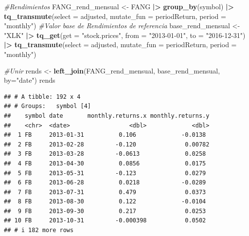 \documentclass[
]{book}
\newenvironment{Shaded}{\begin{snugshade}}{\end{snugshade}}
\newcommand{\AttributeTok}[1]{\textcolor[rgb]{0.13,0.29,0.53}{#1}}
\newcommand{\CommentTok}[1]{\textcolor[rgb]{0.56,0.35,0.01}{\textit{#1}}}
\newcommand{\FunctionTok}[1]{\textcolor[rgb]{0.13,0.29,0.53}{\textbf{#1}}}
\newcommand{\NormalTok}[1]{#1}
\newcommand{\OtherTok}[1]{\textcolor[rgb]{0.56,0.35,0.01}{#1}}
\newcommand{\SpecialCharTok}[1]{\textcolor[rgb]{0.81,0.36,0.00}{\textbf{#1}}}
\newcommand{\StringTok}[1]{\textcolor[rgb]{0.31,0.60,0.02}{#1}}
\begin{document}
\begin{Shaded}
\begin{Highlighting}[]
\CommentTok{\#Rendimientos}
\NormalTok{FANG\_rend\_mensual }\OtherTok{\textless{}{-}}\NormalTok{ FANG }\SpecialCharTok{|\textgreater{}} \FunctionTok{group\_by}\NormalTok{(symbol) }\SpecialCharTok{|\textgreater{}} 
                     \FunctionTok{tq\_transmute}\NormalTok{(}\AttributeTok{select =}\NormalTok{ adjusted,}
                                  \AttributeTok{mutate\_fun =}\NormalTok{ periodReturn,}
                                  \AttributeTok{period =} \StringTok{"monthly"}\NormalTok{)}
\CommentTok{\#Valor base de Rendimientos de referencia}
\NormalTok{base\_rend\_mensual }\OtherTok{\textless{}{-}} \StringTok{"XLK"} \SpecialCharTok{|\textgreater{}} \FunctionTok{tq\_get}\NormalTok{(}\AttributeTok{get =} \StringTok{"stock.prices"}\NormalTok{,}
                                            \AttributeTok{from =} \StringTok{"2013{-}01{-}01"}\NormalTok{,}
                                            \AttributeTok{to =} \StringTok{"2016{-}12{-}31"}\NormalTok{) }\SpecialCharTok{|\textgreater{}} 
                              \FunctionTok{tq\_transmute}\NormalTok{(}\AttributeTok{select =}\NormalTok{ adjusted,}
                                           \AttributeTok{mutate\_fun =}\NormalTok{ periodReturn,}
                                           \AttributeTok{period =} \StringTok{"monthly"}\NormalTok{)}

\CommentTok{\#Unir }
\NormalTok{rends }\OtherTok{\textless{}{-}} \FunctionTok{left\_join}\NormalTok{(FANG\_rend\_mensual, base\_rend\_mensual, }\AttributeTok{by=}\StringTok{"date"}\NormalTok{)}
\NormalTok{rends}
\end{Highlighting}
\end{Shaded}

\begin{verbatim}
## # A tibble: 192 x 4
## # Groups:   symbol [4]
##    symbol date       monthly.returns.x monthly.returns.y
##    <chr>  <date>                 <dbl>             <dbl>
##  1 FB     2013-01-31          0.106             -0.0138 
##  2 FB     2013-02-28         -0.120              0.00782
##  3 FB     2013-03-28         -0.0613             0.0258 
##  4 FB     2013-04-30          0.0856             0.0175 
##  5 FB     2013-05-31         -0.123              0.0279 
##  6 FB     2013-06-28          0.0218            -0.0289 
##  7 FB     2013-07-31          0.479              0.0373 
##  8 FB     2013-08-30          0.122             -0.0104 
##  9 FB     2013-09-30          0.217              0.0253 
## 10 FB     2013-10-31         -0.000398           0.0502 
## # i 182 more rows
\end{verbatim}
\end{document}
